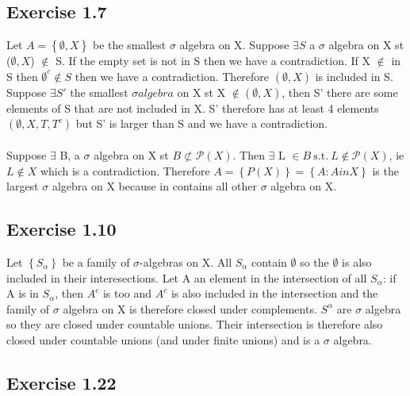 \documentclass[11pt]{article}
\numberwithin{equation}{section}
\theoremstyle{plain}
\theoremstyle{definition}
\newcommand\braces[1]{\left\{ #1 \right\}}
\def\ss{\subset}
\def\nss{\not \ss}
\newcommand{\st}{\ensuremath{\ \mathrm{s.t.}\ }}
\newcommand{\1}{\mathbbm 1}
\def\a{\alpha}
\def\s{\sigma}
\newcommand{\pP}{\mathcal P}
\begin{document}
\subsection*{Exercise 1.7} %
\noindent Let $A = \left\{ \emptyset, X \right\}$ be the smallest $\s$ algebra on X. 
Suppose $\exists S$ a $\s$ algebra on X st ($\emptyset, X$) $\notin$ S. If the empty set is not in S then we have a contradiction. If X $\notin$ in S then $\emptyset^c \notin S$ then we have a contradiction. Therefore $(\emptyset, X)$ is included in S.
Suppose $\exists S'$ the smallest $\s algebra$ on X st X $\notin (\emptyset, X)$, then S' there are some elements of S that are not included in X. S' therefore has at least 4 elements $(\emptyset, X, T, T^c)$ but S' is larger than S and we have a contradiction.
\\
\\
\noindent 
Suppose $\exists$ B, a $\s$ algebra on X st $B \nss \pP(X)$. Then $\exists$ L $ \in B \st L \notin \pP(X)$, ie $L \notin X$ which is a contradiction. Therefore $A = \left\{P(X) \right\} = \left\{A:A in X \right\}$ is the largest $\s$ algebra on X because in contains all other $\s$ algebra on X.




\subsection*{Exercise 1.10} %

Let $\braces{S_\a}$ be a family of $\s$-algebras on X. 
All $S_\a$ contain $\emptyset$ so the $\emptyset$ is also included in their interesections. 
Let A an element in the intersection of all $S_\a$: if A is in $S_\a$, then $A^c$ is too and $A^c$ is also included in the intersection and the family of $\s$ algebra on X is therefore closed under complements. 
$S^\a$ are $\s$ algebra so they are closed under countable unions. Their intersection is therefore also closed under countable unions (and under finite unions) and is a $\s$ algebra.



\subsection*{Exercise 1.22} %
\end{document}
